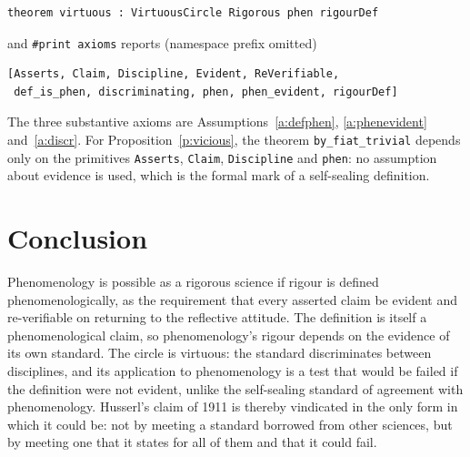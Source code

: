 \documentclass{situationist-preprint}
\begin{document}
\begin{lstlisting}
theorem virtuous : VirtuousCircle Rigorous phen rigourDef
\end{lstlisting}

\noindent and \texttt{\#print axioms} reports (namespace prefix omitted)

\begin{lstlisting}
[Asserts, Claim, Discipline, Evident, ReVerifiable,
 def_is_phen, discriminating, phen, phen_evident, rigourDef]
\end{lstlisting}

\noindent The three substantive axioms are Assumptions~\ref{a:defphen}, \ref{a:phenevident} and~\ref{a:discr}. For Proposition~\ref{p:vicious}, the theorem \texttt{by\_fiat\_trivial} depends only on the primitives \texttt{Asserts}, \texttt{Claim}, \texttt{Discipline} and \texttt{phen}: no assumption about evidence is used, which is the formal mark of a self-sealing definition.

\section{Conclusion}

Phenomenology is possible as a rigorous science if rigour is defined phenomenologically, as the requirement that every asserted claim be evident and re-verifiable on returning to the reflective attitude. The definition is itself a phenomenological claim, so phenomenology's rigour depends on the evidence of its own standard. The circle is virtuous: the standard discriminates between disciplines, and its application to phenomenology is a test that would be failed if the definition were not evident, unlike the self-sealing standard of agreement with phenomenology. Husserl's claim of 1911 is thereby vindicated in the only form in which it could be: not by meeting a standard borrowed from other sciences, but by meeting one that it states for all of them and that it could fail.
\end{document}
